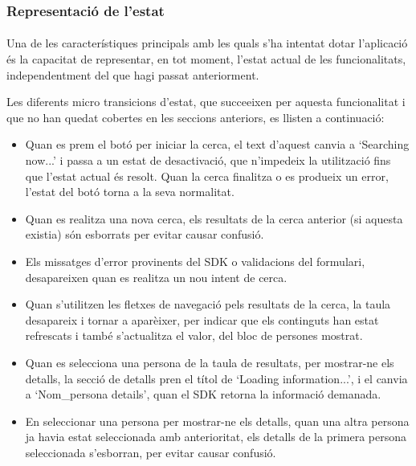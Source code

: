 \subsubsection{Representació de l'estat}

\paragraph{}
Una de les característiques principals amb les quals s'ha intentat dotar l'aplicació és la capacitat de representar, en tot moment, l'estat actual de les funcionalitats, independentment del que hagi passat anteriorment.

Les diferents micro transicions d'estat, que succeeixen per aquesta funcionalitat i que no han quedat cobertes en les seccions anteriors, es llisten a continuació:

\begin{itemize}
    \item Quan es prem el botó per iniciar la cerca, el text d'aquest canvia a `Searching now...' i passa a un estat de desactivació, que n'impedeix la utilització fins que l'estat actual és resolt. Quan la cerca finalitza o es produeix un error, l'estat del botó torna a la seva normalitat.
    \item Quan es realitza una nova cerca, els resultats de la cerca anterior (si aquesta existia) són esborrats per evitar causar confusió.
    \item Els missatges d'error provinents del SDK o validacions del formulari, desapareixen quan es realitza un nou intent de cerca.
    \item Quan s'utilitzen les fletxes de navegació pels resultats de la cerca, la taula desapareix i tornar a aparèixer, per indicar que els continguts han estat refrescats i també s'actualitza el valor, del bloc de persones mostrat.
    \item Quan es selecciona una persona de la taula de resultats, per mostrar-ne els detalls, la secció de detalls pren el títol de `Loading information...', i el canvia a `Nom\_persona details', quan el SDK retorna la informació demanada.
    \item En seleccionar una persona per mostrar-ne els detalls, quan una altra persona ja havia estat seleccionada amb anterioritat, els detalls de la primera persona seleccionada s’esborran, per evitar causar confusió.
\end{itemize}
